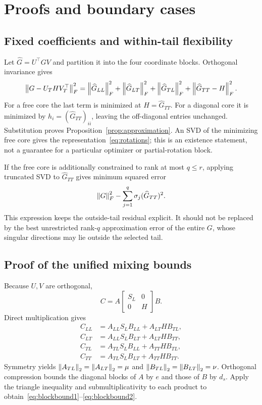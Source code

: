 \section{Proofs and boundary cases}
\label{app:proofs}

\subsection{Fixed coefficients and within-tail flexibility}
\label{app:approximation}
Let $\widehat G=U^\top G V$ and partition it into the four coordinate blocks. Orthogonal invariance gives
\begin{equation}
\left\|G-U_T H V_T^\top\right\|_F^2
=\left\|\widehat G_{LL}\right\|_F^2+\left\|\widehat G_{LT}\right\|_F^2
+\left\|\widehat G_{TL}\right\|_F^2+\left\|\widehat G_{TT}-H\right\|_F^2.
\end{equation}
For a free core the last term is minimized at $H=\widehat G_{TT}$. For a diagonal core it is minimized by $h_i=(\widehat G_{TT})_{ii}$, leaving the off-diagonal entries unchanged. Substitution proves Proposition~\ref{prop:approximation}. An SVD of the minimizing free core gives the representation~\eqref{eq:rotations}; this is an existence statement, not a guarantee for a particular optimizer or partial-rotation block.

If the free core is additionally constrained to rank at most $q\le r$, applying truncated SVD to $\widehat G_{TT}$ gives minimum squared error
\begin{equation}
\left\|G\right\|_F^2-\sum_{j=1}^q\sigma_j(\widehat G_{TT})^2.
\end{equation}
This expression keeps the outside-tail residual explicit. It should not be replaced by the best unrestricted rank-$q$ approximation error of the entire $G$, whose singular directions may lie outside the selected tail.

\subsection{Proof of the unified mixing bounds}
\label{app:mixingproof}
Because $U,V$ are orthogonal,
\begin{equation}
C=A\begin{bmatrix}S_L&0\\0&H\end{bmatrix}B.
\end{equation}
Direct multiplication gives
\begin{align}
C_{LL}&=A_{LL}S_LB_{LL}+A_{LT}HB_{TL},\\
C_{LT}&=A_{LL}S_LB_{LT}+A_{LT}HB_{TT},\\
C_{TL}&=A_{TL}S_LB_{LL}+A_{TT}HB_{TL},\\
C_{TT}&=A_{TL}S_LB_{LT}+A_{TT}HB_{TT}.
\end{align}
Symmetry yields $\left\|A_{TL}\right\|_2=\left\|A_{LT}\right\|_2=\mu$ and $\left\|B_{TL}\right\|_2=\left\|B_{LT}\right\|_2=\nu$. Orthogonal compression bounds the diagonal blocks of $A$ by $e$ and those of $B$ by $d_s$. Apply the triangle inequality and submultiplicativity to each product to obtain~\eqref{eq:blockbound1}--\eqref{eq:blockbound2}.

